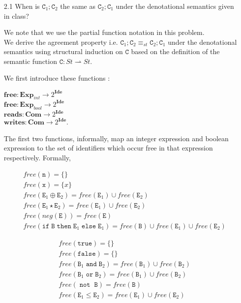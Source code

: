 \documentclass[a4paper,10pt]{article}
\newcommand{\E}{\mathtt{E}}
\newcommand{\B}{\mathtt{B}}
\newcommand{\C}{\mathtt{C}}
\newcommand{\true}{\mathtt{true}}
\newcommand{\false}{\mathtt{false}}
\newcommand{\andsym}{\mathtt{and}}
\newcommand{\orsym}{\mathtt{or}}
\newcommand{\notsym}{\mathop{\mathtt{not}}}
\newcommand{\ifsym}{\mathtt{if}}
\newcommand{\then}{\mathtt{then}}
\newcommand{\elsesym}{\mathtt{else}}
\newcommand{\question}[1]
{\color{DarkBlue}#1 \color{Black} \newline}
\begin{document}
\begin{enumerate}

\question{
\item[2.1] When is $\C_1 ; \C_2$ the same as $\C_2 ; \C_1$ under the denotational semantics given in class?
}

We note that we use the partial function notation in this problem.\\

We derive the agreement property i.e. $\C_1 ; \C_2 \equiv_{st} \C_2 ; \C_1$
under the denotational semantics using structural induction on $\C$ based on the
definition of the semantic function $\C : St \rightharpoonup St$.

We first introduce these functions :

$\textbf{free} : \textbf{Exp}_{int} \rightarrow 2^{ \textbf{Ide} }$ \\
$\textbf{free} : \textbf{Exp}_{bool} \rightarrow 2^{ \textbf{Ide} }$ \\
$\textbf{reads} : \textbf{Com} \rightarrow 2^{ \textbf{Ide} }$ \\
$\textbf{writes} : \textbf{Com} \rightarrow 2^{ \textbf{Ide} }$. 

The first two functions, informally, map an integer expression and boolean
expression to the set of identifiers which occur free in that 
expression respectively. Formally,

\begin{align*}
& free(\mathtt{n}) = \{\} \\
& free(\mathtt{x}) = \{x\} \\
& free(\E_{1} \oplus \E_{2}) = free(\E_{1}) \cup free(\E_{2}) \\
& free(\E_{1} \star \E_{2}) = free(\E_{1}) \cup free(\E_{2}) \\
& free(neg(\E)) = free(\E) \\
& free(\ifsym \; \B \; \then \; \E_{1} \; \elsesym \; \E_{1}) = free(\B) \cup
free(\E_{1}) \cup free(\E_{2})
\end{align*}

\begin{align*}
& free(\true) = \{\} \\
& free(\false) = \{\} \\
& free(\B_{1} \; \andsym \; \B_{2}) = free(\B_{1}) \cup free(\B_{2}) \\
& free(\B_{1} \; \orsym \; \B_{2}) = free(\B_{1}) \cup free(\B_{2}) \\
& free(\notsym \; \B) = free(\B) \\
& free(\E_{1} \leq \E_{2}) = free(\E_{1}) \cup free(\E_{2})
\end{align*}


\end{enumerate}
\end{document}
